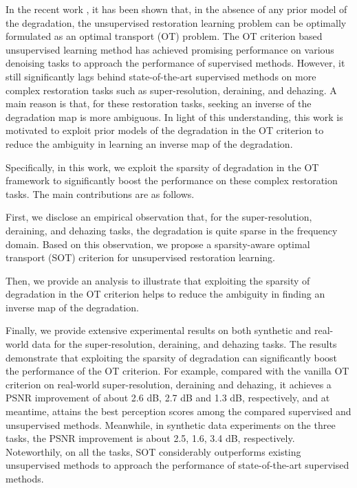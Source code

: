 \documentclass[10pt,journal,compsoc]{IEEEtran}
\begin{document}
In the recent work \cite{wang2022optimal},
it has been shown that, in the absence of any 
prior model of the degradation,
the unsupervised restoration learning problem 
can be optimally formulated as an optimal transport (OT) problem.
The OT criterion based unsupervised learning method has 
achieved promising performance on various denoising 
tasks to approach the performance of supervised methods.
However, it still significantly lags behind state-of-the-art 
supervised methods on more complex restoration tasks 
such as super-resolution, deraining, and dehazing.
A main reason is that, for these restoration tasks,
seeking an inverse of the degradation map is more ambiguous.
In light of this understanding, this work is motivated to
exploit prior models of the degradation 
in the OT criterion to reduce the ambiguity in learning 
an inverse map of the degradation.

Specifically, in this work, we exploit the sparsity 
of degradation in the OT framework to significantly 
boost the performance on these complex restoration tasks. 
The main contributions are as follows.

First, we disclose an empirical observation that, for the 
super-resolution, deraining, and dehazing tasks, the degradation is 
quite sparse in the frequency domain. Based on this observation,
we propose a sparsity-aware optimal transport (SOT) criterion for 
unsupervised restoration learning. 

Then, we provide an analysis to illustrate that 
exploiting the sparsity of degradation  
in the OT criterion helps to reduce the ambiguity in finding 
an inverse map of the degradation. 

Finally, we provide extensive experimental results on both synthetic 
and real-world data for the super-resolution, deraining, 
and dehazing tasks. The results demonstrate that 
exploiting the sparsity of degradation can significantly 
boost the performance of the OT criterion.
For example, compared with the vanilla OT criterion 
on real-world super-resolution, deraining and dehazing, 
it achieves a PSNR improvement of about 2.6 dB, 2.7 dB and 1.3 dB, respectively,
and at meantime, attains the best perception scores 
among the compared supervised and unsupervised methods.
Meanwhile, in synthetic data experiments on the three tasks,
the PSNR improvement is about 2.5, 1.6, 3.4 dB, respectively.
Noteworthily, on all the tasks, SOT considerably outperforms existing unsupervised methods 
to approach the performance of state-of-the-art supervised methods.
\end{document}
